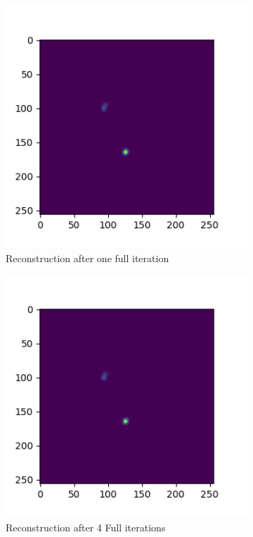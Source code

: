 \begin{figure}[h]
	\centering
	\begin{subfigure}[b]{0.45\linewidth}
		\includegraphics[width=\linewidth]{./chapters/05.algorithms/sim02/image.png}
		\caption{Reconstruction after one full iteration}
		\label{results:g55:nrao:rec}
	\end{subfigure}
	\begin{subfigure}[b]{0.45\linewidth}
		\includegraphics[width=\linewidth]{./chapters/05.algorithms/sim02/image4.png}
		\caption{Reconstruction after 4 Full iterations}
		\label{results:g55:nrao:dirty}
	\end{subfigure}
	\caption{}
	\label{results:g55:nrao}
\end{figure}

